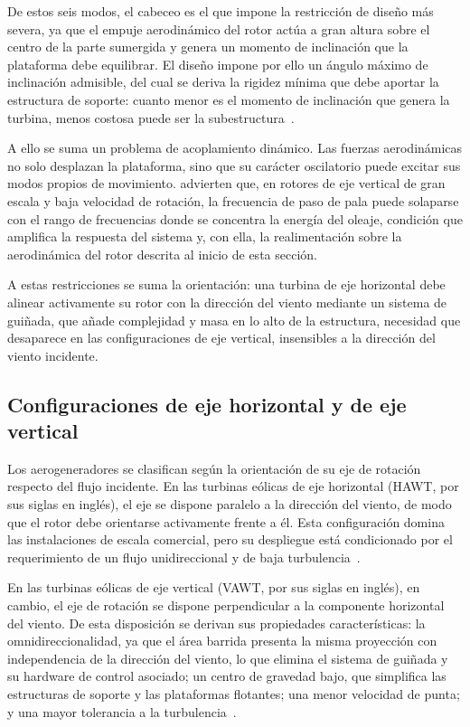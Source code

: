 De estos seis modos, el cabeceo es el que impone la restricción de diseño más severa, ya que el empuje aerodinámico del rotor actúa a gran altura sobre el centro de la parte sumergida y genera un momento de inclinación que la plataforma debe equilibrar. El diseño impone por ello un ángulo máximo de inclinación admisible, del cual se deriva la rigidez mínima que debe aportar la estructura de soporte: cuanto menor es el momento de inclinación que genera la turbina, menos costosa puede ser la subestructura~\parencite{Borg2015}.

A ello se suma un problema de acoplamiento dinámico. Las fuerzas aerodinámicas no solo desplazan la plataforma, sino que su carácter oscilatorio puede excitar sus modos propios de movimiento. \textcite{Borg2015} advierten que, en rotores de eje vertical de gran escala y baja velocidad de rotación, la frecuencia de paso de pala puede solaparse con el rango de frecuencias donde se concentra la energía del oleaje, condición que amplifica la respuesta del sistema y, con ella, la realimentación sobre la aerodinámica del rotor descrita al inicio de esta sección.

A estas restricciones se suma la orientación: una turbina de eje horizontal debe alinear activamente su rotor con la dirección del viento mediante un sistema de guiñada, que añade complejidad y masa en lo alto de la estructura, necesidad que desaparece en las configuraciones de eje vertical, insensibles a la dirección del viento incidente.

\subsection{Configuraciones de eje horizontal y de eje vertical}

Los aerogeneradores se clasifican según la orientación de su eje de rotación respecto del flujo incidente. En las turbinas eólicas de eje horizontal (HAWT, por sus siglas en inglés), el eje se dispone paralelo a la dirección del viento, de modo que el rotor debe orientarse activamente frente a él. Esta configuración domina las instalaciones de escala comercial, pero su despliegue está condicionado por el requerimiento de un flujo unidireccional y de baja turbulencia~\parencite{Essahraoui2026}.

En las turbinas eólicas de eje vertical (VAWT, por sus siglas en inglés), en cambio, el eje de rotación se dispone perpendicular a la componente horizontal del viento. De esta disposición se derivan sus propiedades características: la omnidireccionalidad, ya que el área barrida presenta la misma proyección con independencia de la dirección del viento, lo que elimina el sistema de guiñada y su hardware de control asociado; un centro de gravedad bajo, que simplifica las estructuras de soporte y las plataformas flotantes; una menor velocidad de punta; y una mayor tolerancia a la turbulencia~\parencite{Essahraoui2026}.

